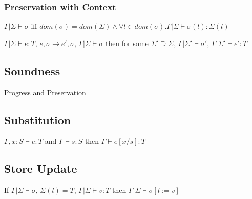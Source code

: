 \documentclass[10pt,a4paper]{article}
\begin{document}
\subsubsection{Preservation with Context}
$Γ|Σ \vdash σ$ iff $dom(σ) = dom(Σ) ∧ ∀l ∈ dom(σ). Γ|Σ \vdash σ(l) : Σ(l)$

$Γ|Σ \vdash e: T$, $e, σ → e', σ$, $Γ|Σ \vdash σ$ then for some $Σ' \supseteq Σ$, $Γ|Σ' \vdash σ'$, $Γ|Σ' \vdash e' : T$

\subsection{Soundness}
Progress and Preservation

\subsection{Substitution}
$Γ, x: S \vdash e:T$ and $Γ \vdash s: S$ then $Γ \vdash e[x/s]:T$

\subsection{Store Update}
If $Γ|Σ \vdash σ$, $Σ(l)= T$, $Γ|Σ \vdash v:T$ then $Γ|Σ \vdash σ[l := v]$
\end{document}
